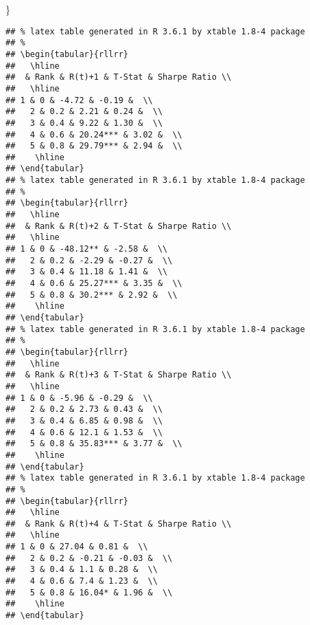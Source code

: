 \documentclass[
]{article}
\newenvironment{Shaded}{\begin{snugshade}}{\end{snugshade}}
\newcommand{\NormalTok}[1]{#1}
\begin{document}
\begin{Shaded}
\begin{Highlighting}[]
\NormalTok{\}}
\end{Highlighting}
\end{Shaded}

\begin{verbatim}
## % latex table generated in R 3.6.1 by xtable 1.8-4 package
## % 
## \begin{tabular}{rllrr}
##   \hline
##  & Rank & R(t)+1 & T-Stat & Sharpe Ratio \\ 
##   \hline
## 1 & 0 & -4.72 & -0.19 &  \\ 
##   2 & 0.2 & 2.21 & 0.24 &  \\ 
##   3 & 0.4 & 9.22 & 1.30 &  \\ 
##   4 & 0.6 & 20.24*** & 3.02 &  \\ 
##   5 & 0.8 & 29.79*** & 2.94 &  \\ 
##    \hline
## \end{tabular}
## % latex table generated in R 3.6.1 by xtable 1.8-4 package
## % 
## \begin{tabular}{rllrr}
##   \hline
##  & Rank & R(t)+2 & T-Stat & Sharpe Ratio \\ 
##   \hline
## 1 & 0 & -48.12** & -2.58 &  \\ 
##   2 & 0.2 & -2.29 & -0.27 &  \\ 
##   3 & 0.4 & 11.18 & 1.41 &  \\ 
##   4 & 0.6 & 25.27*** & 3.35 &  \\ 
##   5 & 0.8 & 30.2*** & 2.92 &  \\ 
##    \hline
## \end{tabular}
## % latex table generated in R 3.6.1 by xtable 1.8-4 package
## % 
## \begin{tabular}{rllrr}
##   \hline
##  & Rank & R(t)+3 & T-Stat & Sharpe Ratio \\ 
##   \hline
## 1 & 0 & -5.96 & -0.29 &  \\ 
##   2 & 0.2 & 2.73 & 0.43 &  \\ 
##   3 & 0.4 & 6.85 & 0.98 &  \\ 
##   4 & 0.6 & 12.1 & 1.53 &  \\ 
##   5 & 0.8 & 35.83*** & 3.77 &  \\ 
##    \hline
## \end{tabular}
## % latex table generated in R 3.6.1 by xtable 1.8-4 package
## % 
## \begin{tabular}{rllrr}
##   \hline
##  & Rank & R(t)+4 & T-Stat & Sharpe Ratio \\ 
##   \hline
## 1 & 0 & 27.04 & 0.81 &  \\ 
##   2 & 0.2 & -0.21 & -0.03 &  \\ 
##   3 & 0.4 & 1.1 & 0.28 &  \\ 
##   4 & 0.6 & 7.4 & 1.23 &  \\ 
##   5 & 0.8 & 16.04* & 1.96 &  \\ 
##    \hline
## \end{tabular}
\end{verbatim}
\end{document}
